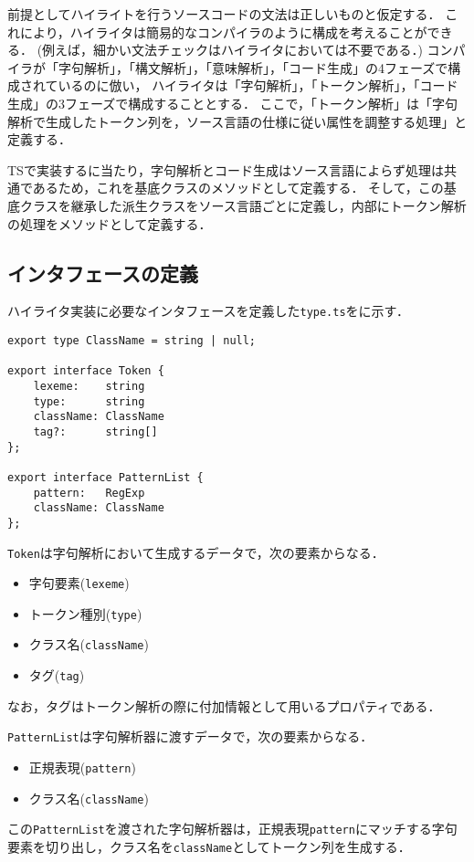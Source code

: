 \documentclass[autodetect-engine,dvi=dvipdfmx,ja=standard,
               a4j,11pt]{bxjsarticle}
\newcommand{\figref}[1]{\makebox{図~\ref{#1}}}
\begin{document}
前提としてハイライトを行うソースコードの文法は正しいものと仮定する．
これにより，ハイライタは簡易的なコンパイラのように構成を考えることができる．
(例えば，細かい文法チェックはハイライタにおいては不要である．)
コンパイラが「字句解析」，「構文解析」，「意味解析」，「コード生成」の4フェーズで構成されているのに倣い，
ハイライタは「字句解析」，「トークン解析」，「コード生成」の3フェーズで構成することとする．
ここで，「トークン解析」は「字句解析で生成したトークン列を，ソース言語の仕様に従い属性を調整する処理」と定義する．

TSで実装するに当たり，字句解析とコード生成はソース言語によらず処理は共通であるため，これを基底クラスのメソッドとして定義する．
そして，この基底クラスを継承した派生クラスをソース言語ごとに定義し，内部にトークン解析の処理をメソッドとして定義する．

\subsection{インタフェースの定義}

ハイライタ実装に必要なインタフェースを定義した\verb|type.ts|を\figref{prog:type}に示す．

\begin{lstlisting}[caption={インタフェースの定義({\tt type.ts})}, label={prog:type}]
export type ClassName = string | null;

export interface Token {
    lexeme:    string
    type:      string
    className: ClassName
    tag?:      string[] 
};

export interface PatternList {
    pattern:   RegExp
    className: ClassName
};
\end{lstlisting}

\verb|Token|は字句解析において生成するデータで，次の要素からなる．
\begin{itemize}
    \item 字句要素(\verb|lexeme|)
    \item トークン種別(\verb|type|)
    \item クラス名(\verb|className|)
    \item タグ(\verb|tag|)
\end{itemize}
%
なお，タグはトークン解析の際に付加情報として用いるプロパティである．

\verb|PatternList|は字句解析器に渡すデータで，次の要素からなる．
\begin{itemize}
    \item 正規表現(\verb|pattern|)
    \item クラス名(\verb|className|)
\end{itemize}
%
この\verb|PatternList|を渡された字句解析器は，正規表現\verb|pattern|にマッチする字句要素を切り出し，クラス名を\verb|className|としてトークン列を生成する．
\end{document}
